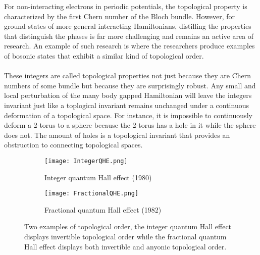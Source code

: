 For non-interacting electrons in periodic potentials, the topological property is characterized by the first Chern number of the Bloch bundle. However, for ground states of more general interacting Hamiltonians, distilling the properties that distinguish the phases is far more challenging and remains an active area of research. An example of such research is \cite{sopenko2023chiral} where the researchers produce examples of bosonic states that exhibit a similar kind of topological order.
\\\\
These integers are called topological properties not just because they are Chern numbers of some bundle but because they are surprisingly robust. Any small and local perturbation of the many body gapped Hamiltonian will leave the integers invariant just like a toplogical invariant remains unchanged under a continuous deformation of a topological space. For instance, it is impossible to continuously deform a 2-torus to a sphere because the 2-torus has a hole in it while the sphere does not. The amount of holes is a topological invariant that provides an obstruction to connecting topological spaces.
\begin{figure}
	\centering
	\begin{subfigure}[b]{0.45\textwidth}
		\centering
		\texttt{[image: IntegerQHE.png]}
		\caption{Integer quantum Hall effect (1980)}
	\end{subfigure}
	\hfill
	\begin{subfigure}[b]{0.45\textwidth}
		\centering
		\texttt{[image: FractionalQHE.png]}
		\caption{Fractional quantum Hall effect (1982)}
	\end{subfigure}
	\caption{Two examples of topological order, the integer quantum Hall effect displays invertible topological order while the fractional quantum Hall effect displays both invertible and anyonic topological order.}
	\label{fig:TopologicalOrderFigures}
\end{figure}
